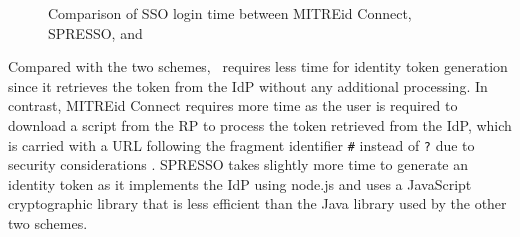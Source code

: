 \begin{figure}[tb]
  \centering
  \caption{Comparison of SSO login time between MITREid Connect, SPRESSO, and \usso}
  \label{fig:evaluation}
\end{figure}

Compared with the two schemes, \usso\ requires less time for identity token generation since it retrieves the token from the IdP without any additional processing. In contrast,
MITREid Connect requires more time as the user is required to download a script from the RP to process the token retrieved from the IdP, which is carried with a URL following the fragment identifier \verb+#+ instead of \verb+?+ due to security considerations \cite{de2014oauth}. SPRESSO takes slightly more time to generate an identity token as it implements the IdP using node.js and uses a JavaScript cryptographic library that is less efficient than the Java library used by the other two schemes.

